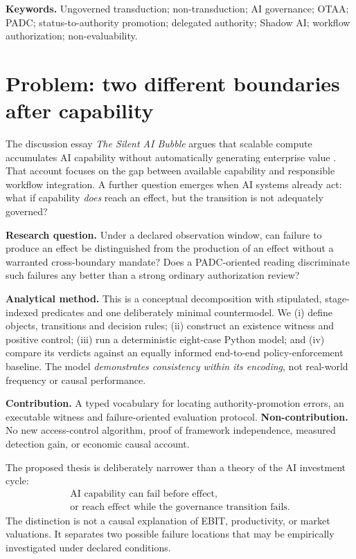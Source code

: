 \documentclass[11pt,a4paper]{article}
\begin{document}
\noindent\textbf{Keywords.} Ungoverned transduction; non-transduction; AI governance; OTAA; PADC; status-to-authority promotion; delegated authority; Shadow AI; workflow authorization; non-evaluability.

\section{Problem: two different boundaries after capability}
The discussion essay \emph{The Silent AI Bubble} argues that scalable compute accumulates AI capability without automatically generating enterprise value \cite{boehm2026essay}. That account focuses on the gap between available capability and responsible workflow integration. A further question emerges when AI systems already act: what if capability \emph{does} reach an effect, but the transition is not adequately governed?

\textbf{Research question.} Under a declared observation window, can failure to produce an effect be distinguished from the production of an effect without a warranted cross-boundary mandate? Does a PADC-oriented reading discriminate such failures any better than a strong ordinary authorization review?

\textbf{Analytical method.} This is a conceptual decomposition with stipulated, stage-indexed predicates and one deliberately minimal countermodel. We (i) define objects, transitions and decision rules; (ii) construct an existence witness and positive control; (iii) run a deterministic eight-case Python model; and (iv) compare its verdicts against an equally informed end-to-end policy-enforcement baseline. The model \emph{demonstrates consistency within its encoding}, not real-world frequency or causal performance.

\textbf{Contribution.} A typed vocabulary for locating authority-promotion errors, an executable witness and failure-oriented evaluation protocol. \textbf{Non-contribution.} No new access-control algorithm, proof of framework independence, measured detection gain, or economic causal account.

The proposed thesis is deliberately narrower than a theory of the AI investment cycle:
\begin{equation}
\boxed{\begin{gathered}
\text{AI capability can fail before effect,}\\[-2pt]
\text{or reach effect while the governance transition fails.}
\end{gathered}}
\label{eq:thesis}
\end{equation}
The distinction is not a causal explanation of EBIT, productivity, or market valuations. It separates two possible failure locations that may be empirically investigated under declared conditions.
\end{document}
